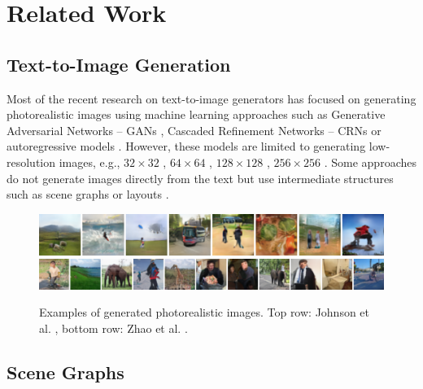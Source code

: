 \chapter{Related Work}

\section{Text-to-Image Generation}

Most of the recent research on text-to-image generators has focused on generating photorealistic images \citep{zhang2017stackgan,ramesh2021zeroshot,johnson2018image,zhao2019image,mansimov2015generating,oord2016conditional,oord2016pixel,reed2016learning} using machine learning approaches such as Generative Adversarial Networks -- GANs \citep{zhang2017stackgan,zhao2019image}, Cascaded Refinement Networks -- CRNs \citep{johnson2018image} or autoregressive models \citep{ramesh2021zeroshot,oord2016conditional,oord2016pixel}.
However, these models are limited to generating low-resolution images, e.g., $32\times32$ \citep{mansimov2015generating,oord2016conditional,oord2016pixel}, $64\times64$ \cite{johnson2018image,oord2016pixel}, $128\times128$ \citep{reed2016learning}, $256\times256$ \citep{zhang2017stackgan,ramesh2021zeroshot}. Some approaches do not generate images directly from the text but use intermediate structures such as scene graphs \citep{johnson2018image,tripathi2019using} or layouts \citep{zhao2019image}. 

\begin{figure}[ht]
    \centering
    \includegraphics[width=\textwidth]{figures/johnson.png}
    \includegraphics[width=\textwidth]{figures/zhao.png}
    \caption[Generated photorealistic images]{Examples of generated photorealistic images. Top row: Johnson et al. \cite{johnson2018image}, bottom row: Zhao et al. \cite{zhao2019image}.}
    \label{fig:photorealistic_examples}
\end{figure}


\section{Scene Graphs}

